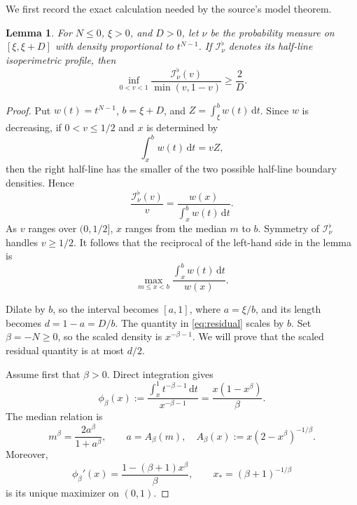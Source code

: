 \documentclass[11pt]{article}
\newtheorem{lemma}{Lemma}
\newcommand{\Jcal}{\mathcal I^\flat}
\newcommand{\dd}{\,\mathrm d}
\begin{document}
We first record the exact calculation needed by the source's model theorem.

\begin{lemma}\label{lem:model}
For \(N\le0\), \(\xi>0\), and \(D>0\), let \(\nu\) be the probability
measure on \([\xi,\xi+D]\) with density proportional to \(t^{N-1}\).  If
\(\Jcal_\nu\) denotes its half-line isoperimetric profile, then
\[
 \inf_{0<v<1}\frac{\Jcal_\nu(v)}{\min(v,1-v)}\ge\frac2D.
\]
\end{lemma}

\begin{proof}
Put \(w(t)=t^{N-1}\), \(b=\xi+D\), and
\(Z=\int_\xi^b w(t)\dd t\).  Since \(w\) is decreasing, if \(0<v\le1/2\)
and \(x\) is determined by
\[
 \int_x^b w(t)\dd t=vZ,
\]
then the right half-line has the smaller of the two possible half-line
boundary densities.  Hence
\begin{equation}\label{eq:hazard}
 \frac{\Jcal_\nu(v)}v
 =\frac{w(x)}{\int_x^b w(t)\dd t}.
\end{equation}
As \(v\) ranges over \((0,1/2]\), \(x\) ranges from the median \(m\) to
\(b\).  Symmetry of \(\Jcal_\nu\) handles \(v\ge1/2\).  It follows that the
reciprocal of the left-hand side in the lemma is
\begin{equation}\label{eq:residual}
 \max_{m\le x<b}\frac{\int_x^b w(t)\dd t}{w(x)}.
\end{equation}

Dilate by \(b\), so the interval becomes \([a,1]\), where
\(a=\xi/b\), and its length becomes \(d=1-a=D/b\).  The quantity in
\eqref{eq:residual} scales by \(b\).  Set \(\beta=-N\ge0\), so the scaled
density is \(x^{-\beta-1}\).  We will prove that the scaled residual quantity
is at most \(d/2\).

Assume first that \(\beta>0\).  Direct integration gives
\begin{equation}\label{eq:phi}
 \phi_\beta(x)
 :=\frac{\int_x^1t^{-\beta-1}\dd t}{x^{-\beta-1}}
 =\frac{x(1-x^\beta)}{\beta}.
\end{equation}
The median relation is
\begin{equation}\label{eq:median}
 m^\beta=\frac{2a^\beta}{1+a^\beta},
 \qquad
 a=A_\beta(m),\quad
 A_\beta(x):=x(2-x^\beta)^{-1/\beta}.
\end{equation}
Moreover,
\[
 \phi_\beta'(x)=\frac{1-(\beta+1)x^\beta}{\beta},
 \qquad
 x_*=(\beta+1)^{-1/\beta}
\]
is its unique maximizer on \((0,1)\).


\end{proof}
\end{document}
